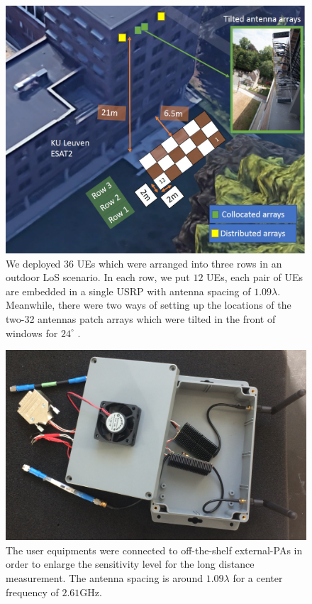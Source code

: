 \begin{figure}[t!]
	\centering
	\includegraphics[width=1\linewidth]{figures/outdoor_scenario.jpg}
	\caption{We deployed $36$ UEs which were arranged into three rows in an outdoor LoS scenario. In each row, we put $12$ UEs, each pair of UEs are embedded in a single USRP with antenna spacing of $1.09\lambda$. Meanwhile, there were two ways of setting up the locations of the two-32 antennas patch arrays which were tilted in the front of windows for $24^\circ$ .}
	\label{fig:The measured outdoor scenario}
\end{figure}


\begin{figure}[t!]
	\centering
	\includegraphics[width=1\linewidth]{figures/user_equipment.PNG}
	\caption{The user equipments were connected to off-the-shelf external-PAs in order to enlarge the sensitivity level for the long distance measurement. The antenna spacing is around $1.09\lambda$ for a center frequency of $2.61$GHz.}
	\label{fig:UserEquipment}
\end{figure}

